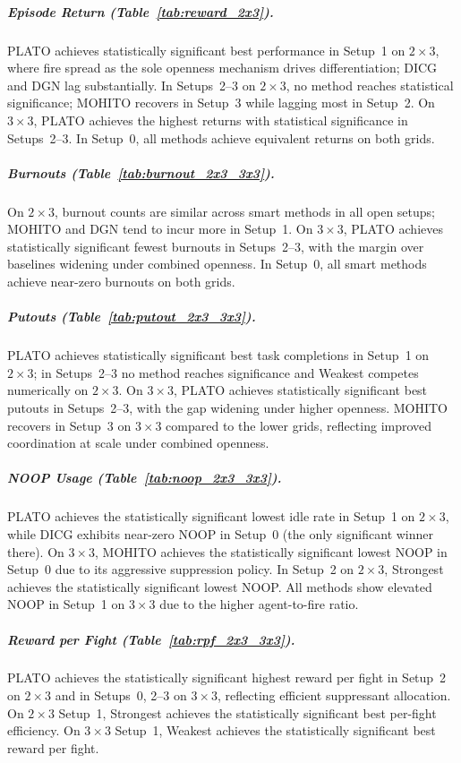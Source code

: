 \subparagraph{Episode Return (Table~\ref{tab:reward_2x3}).}
PLATO achieves statistically significant best performance in Setup~1 on $2\times 3$, where fire spread as the sole openness mechanism drives differentiation; DICG and DGN lag substantially. In Setups~2--3 on $2\times 3$, no method reaches statistical significance; MOHITO recovers in Setup~3 while lagging most in Setup~2. On $3\times 3$, PLATO achieves the highest returns with statistical significance in Setups~2--3. In Setup~0, all methods achieve equivalent returns on both grids.

\subparagraph{Burnouts (Table~\ref{tab:burnout_2x3_3x3}).}
On $2\times 3$, burnout counts are similar across smart methods in all open setups; MOHITO and DGN tend to incur more in Setup~1. On $3\times 3$, PLATO achieves statistically significant fewest burnouts in Setups~2--3, with the margin over baselines widening under combined openness. In Setup~0, all smart methods achieve near-zero burnouts on both grids.

\subparagraph{Putouts (Table~\ref{tab:putout_2x3_3x3}).}
PLATO achieves statistically significant best task completions in Setup~1 on $2\times 3$; in Setups~2--3 no method reaches significance and Weakest competes numerically on $2\times 3$. On $3\times 3$, PLATO achieves statistically significant best putouts in Setups~2--3, with the gap widening under higher openness. MOHITO recovers in Setup~3 on $3\times 3$ compared to the lower grids, reflecting improved coordination at scale under combined openness.

\subparagraph{NOOP Usage (Table~\ref{tab:noop_2x3_3x3}).}
PLATO achieves the statistically significant lowest idle rate in Setup~1 on $2\times 3$, while DICG exhibits near-zero NOOP in Setup~0 (the only significant winner there). On $3\times 3$, MOHITO achieves the statistically significant lowest NOOP in Setup~0 due to its aggressive suppression policy. In Setup~2 on $2\times 3$, Strongest achieves the statistically significant lowest NOOP. All methods show elevated NOOP in Setup~1 on $3\times 3$ due to the higher agent-to-fire ratio.

\subparagraph{Reward per Fight (Table~\ref{tab:rpf_2x3_3x3}).}
PLATO achieves the statistically significant highest reward per fight in Setup~2 on $2\times 3$ and in Setups~0, 2--3 on $3\times 3$, reflecting efficient suppressant allocation. On $2\times 3$ Setup~1, Strongest achieves the statistically significant best per-fight efficiency. On $3\times 3$ Setup~1, Weakest achieves the statistically significant best reward per fight.




